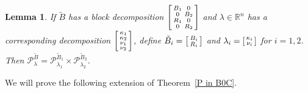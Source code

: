 \documentclass{amsart}
\newtheorem{lemma}[proposition]{Lemma}
\theoremstyle{definition}
\theoremstyle{remark}
\numberwithin{equation}{section}
\newcommand{\reals}{\mathbb R}
\newcommand{\0}{{\mathbf{0}}}
\newcommand{\tB}{{\tilde{B}}}
\newcommand{\R}{\mathcal{R}}
\renewcommand{\P}{\mathcal{P}}
\begin{document}
\begin{lemma}\label{block dom ext}
If $\tB$ has a block decomposition $\begin{bsmallmatrix}B_1&0\\0&B_2\\R_1&0\\0&R_2\end{bsmallmatrix}$ and $\lambda\in\reals^n$ has a corresponding decomposition $\begin{bsmallmatrix}\kappa_1\\\kappa_2\\\nu_1\\\nu_2\end{bsmallmatrix}$, define $\tB_i=\begin{bsmallmatrix}B_i\\R_i\end{bsmallmatrix}$ and $\lambda_i=\begin{bsmallmatrix}\kappa_i\\\nu_i\end{bsmallmatrix}$ for $i=1,2$.
Then $\P_\lambda^\tB=\P_{\lambda_1}^{\tB_1}\times\P_{\lambda_2}^{\tB_2}$.
\end{lemma}

We will prove the following extension of Theorem~\ref{P in B0C}.
\end{document}
